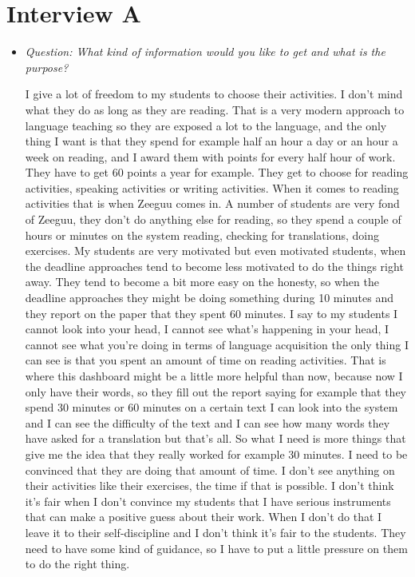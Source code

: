 \chapter{Interview A}\label{interview01}
\begin{itemize}

	\item \textit{Question: What kind of information would you like to get and what is the purpose?}

I give a lot of freedom to my students to choose their activities. I don't mind what they do as long as they are reading. That is a very modern approach to language teaching so they are exposed a lot to the language, and the only thing I want is that they spend for example half an hour a day or an hour a week on reading, and I award them with points for every half hour of work. They have to get 60 points a year for example.
They get to choose for reading activities, speaking activities or writing activities. When it comes to reading activities that is when Zeeguu comes in. A number of students are very fond of Zeeguu, they don't do anything else for reading, so they spend a couple of hours or minutes on the system reading, checking for translations, doing exercises. My students are very motivated but even motivated students, when the deadline approaches tend to become less motivated to do the things right away. They tend to become a bit more easy on the honesty, so when the deadline approaches they might be doing something during 10 minutes and they report on the paper that they spent 60 minutes. I say to my students I cannot look into your head, I cannot see what's happening in your head, I cannot see what you're doing in terms of language acquisition the only thing I can see is that you spent an amount of time on reading activities. That is where this dashboard might be a little more helpful than now, because now I only have their words, so they fill out the report saying for example that they spend 30 minutes or 60 minutes on a certain text I can look into the system and I can see the difficulty of the text and I can see how many words they have asked for a translation but that's all. So what I need is more things that give me the idea that they really worked for example 30 minutes. I need to be convinced that they are doing that amount of time. 
I don't see anything on their activities like their exercises, the time if that is possible. 
I don't think it's fair when I don't convince my students that I have serious instruments that can make a positive guess about their work. When I don't do that I leave it to their self-discipline and I don't think it's fair to the students. They need to have some kind of guidance, so I have to put a little pressure on them to do the right thing.


\end{itemize}
